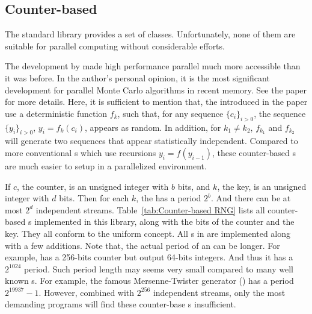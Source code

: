 \subsection{Counter-based \protect\rng}
\label{sub:Counter-based RNG}

The standard library provides a set of \rng classes. Unfortunately, none of
them are suitable for parallel computing without considerable efforts.

The development by \textcite{Salmon:2011um} made high performance parallel \rng
much more accessible than it was before. In the author's personal opinion, it
is the most significant development for parallel Monte Carlo algorithms in
recent memory. See the paper for more details. Here, it is sufficient to
mention that, the \rng introduced in the paper use a deterministic function
$f_k$, such that, for any sequence $\{c_i\}_{i>0}$, the sequence
$\{y_i\}_{i>0}$, $y_i = f_k(c_i)$, appears as random. In addition, for $k_1 \ne
k_2$, $f_{k_1}$ and $f_{k_2}$ will generate two sequences that appear
statistically independent. Compared to more conventional \rng{}s which use
recursions $y_i = f(y_{i - 1})$, these counter-based \rng{}s are much easier to
setup in a parallelized environment.

If $c$, the counter, is an unsigned integer with $b$ bits, and $k$, the key, is
an unsigned integer with $d$ bits. Then for each $k$, the \rng has a period
$2^b$. And there can be at most $2^d$ independent streams.
Table~\ref{tab:Counter-based RNG} lists all counter-based \rng{}s implemented
in this library, along with the bits of the counter and the key. They all
conform to the \cppoo uniform \rng concept. All \rng{}s in
\textcite{Salmon:2011um} are implemented along with a few additions. Note that,
the actual period of an \rng can be longer. For example, 
has a 256-bits counter but output 64-bits integers. And thus it has a
$2^{1024}$ period. Such period length may seems very small compared to many
well known \rng{}s. For example, the famous Mersenne-Twister generator
() has a period $2^{19937} - 1$. However, combined with
$2^{256}$ independent streams, only the most demanding programs will find these
counter-base \rng{}s insufficient.

